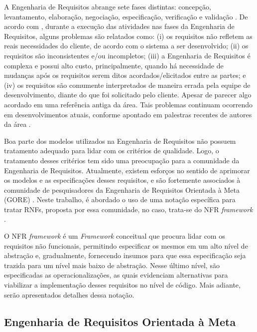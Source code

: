 A Engenharia de Requisitos abrange sete fases distintas: concepção, levantamento, elaboração, negociação, especificação, verificação e validação \cite{pressman2011engenharia}. De acordo com \cite{kotonya1998requirements}, durante a execução das atividades nas fases da Engenharia de Requisitos, alguns problemas são relatados como: (i) os requisitos não refletem as reais necessidades do cliente, de acordo com o sistema a ser desenvolvido; (ii) os requisitos são inconsistentes e/ou incompletos; (iii) a Engenharia de Requisitos é complexa e possui alto custo, principalmente, quando há necessidade de mudanças após os requisitos serem ditos acordados/elicitados entre as partes; e (iv) os requisitos são comumente interpretados de maneira errada pela equipe de desenvolvimento, diante do que foi solicitado pelo cliente. Apesar de parecer algo acordado em uma referência antiga da área. Tais problemas continuam ocorrendo em desenvolvimentos atuais, conforme apontado em palestras recentes de autores da área \cite{palestrasilvio}. 

Boa parte dos modelos utilizados na Engenharia de Requisitos não possuem tratamento adequado para lidar com os critérios de qualidade. Logo, o tratamento desses critérios tem sido uma preocupação para a comunidade da Engenharia de Requisitos. Atualmente, existem esforços no sentido de aprimorar os modelos e as especificações desses requisitos, e são fortemente associados à comunidade de pesquisadores da Engenharia de Requisitos Orientada à Meta (GORE) \cite{chung2012non}. Neste trabalho, é abordado o uso de uma notação específica para tratar RNFs, proposta por essa comunidade, no caso, trata-se do NFR \textit{framework} \cite{chung2012non}. 

O NFR \textit{framework} é um \textit{Framework} conceitual que procura lidar com os requisitos não funcionais, permitindo especificar os mesmos em um alto nível de abstração e, gradualmente, fornecendo insumos para que essa especificação seja trazida para um nível mais baixo de abstração. Nesse último nível, são especificadas as operacionalizações, as quais evidenciam alternativas para viabilizar a implementação desses requisitos no nível de código. Mais adiante, serão apresentados detalhes dessa notação.

\subsection{Engenharia de Requisitos Orientada à Meta}
\label{subsec:orientacaoMeta}

